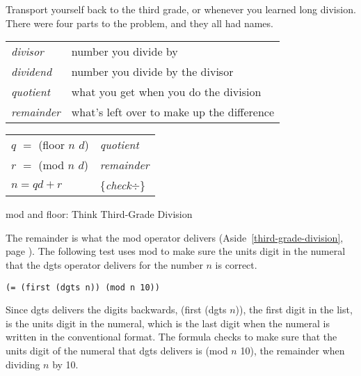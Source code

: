 \begin{aside}
Transport yourself back to the third grade,
or whenever you learned long division.
There were four parts to the problem, and they all had names.

\begin{tabular}{ll}
\emph{divisor}   & number you divide by \\
\emph{dividend}  & number you divide by the divisor \\
\emph{quotient}  & what you get when you do the division \\
\emph{remainder} & what's left over to make up the difference
\end{tabular}
\begin{center}
\begin{tabular}{ll}
$q$ $=$ \textsf{(floor $n$ $d$)} & \emph{quotient}  \\
$r$ $=$ \textsf{(mod $n$ $d$)}   & \emph{remainder} \\
$n = qd + r$            & \{\emph{check}$\div$\} \\
\end{tabular}
\end{center}
\caption{\textsf{mod} and \textsf{floor}: Think Third-Grade Division}
\label{third-grade-division}
\end{aside}

The remainder is
what the \textsf{mod} operator delivers
(Aside~\ref{third-grade-division}, page \pageref{third-grade-division}).
The following test uses \textsf{mod} to make sure the units digit in the numeral
that the \textsf{dgts} operator delivers for the number $n$ is correct.
\begin{Verbatim}
(= (first (dgts n)) (mod n 10))
\end{Verbatim}

Since \textsf{dgts} delivers the digits backwards,
\textsf{(first (dgts $n$))}, the first digit in the list,
is the units digit in the numeral, which is the last digit
when the numeral is written in the conventional format.
The formula checks to make sure that
the units digit of the numeral that
\textsf{dgts} delivers is \textsf{(mod $n$ 10)},
the remainder when dividing $n$ by 10.

